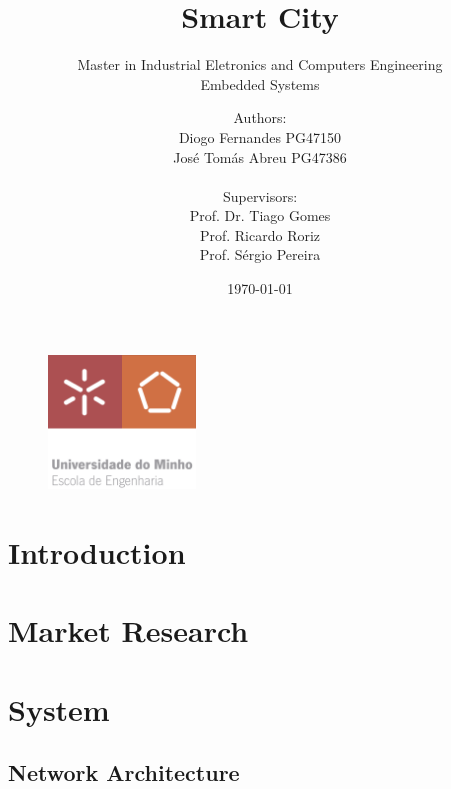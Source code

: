 \documentclass[12pt, letterpaper]{report}
\title{\textbf{Smart City}}
\subtitle{{\large Master in Industrial Eletronics and Computers Engineering} \\ {\large Embedded Systems}}
\author{Authors:\\Diogo Fernandes PG47150\\José Tomás Abreu PG47386\\ \\ Supervisors:\\Prof. Dr. Tiago Gomes\\Prof. Ricardo Roriz\\Prof. Sérgio Pereira}
\date{\today}
\begin{document}
{\begin{figure}[t]
	\centering
	\includegraphics[width=0.35\textwidth]{EEUMLOGO}
\end{figure}}

\maketitle

\cleardoublepage
\pagestyle{empty}

\tableofcontents
\clearpage

\clearpage
{}\listoffigures


\clearpage
{}
\printacronyms

\newpage


\pagestyle{IHA-fancy-style}
\chapter{Introduction}


\chapter{Market Research}


\chapter{System}

\section{Network Architecture}

\end{document}
